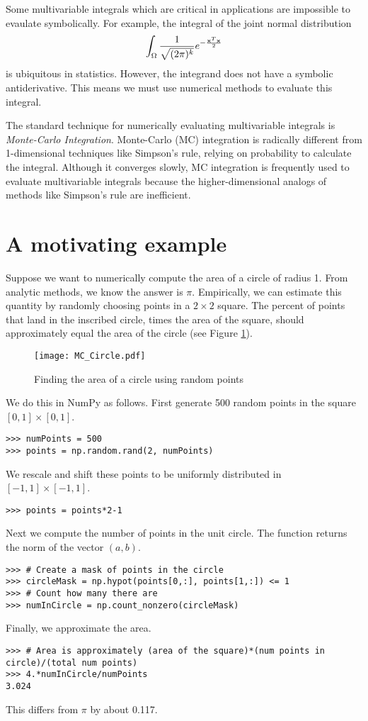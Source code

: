 
Some multivariable integrals which are critical in applications are impossible to evaulate symbolically.
For example, the integral of the joint normal distribution
\[
\int_{\Omega} \frac{1}{\sqrt{(2 \pi)^k}} e^{- \frac{\bold{x}^T\bold{x}}{2}}
\]
is ubiquitous in statistics.
However, the integrand does not have a symbolic antiderivative.
This means we must use numerical methods to evaluate this integral.

The standard technique for numerically evaluating multivariable integrals is \emph{Monte-Carlo Integration}.
Monte-Carlo (MC) integration is radically different from 1-dimensional techniques like Simpson's rule, relying on probability to calculate the integral.
Although it converges slowly, MC integration is frequently used to evaluate multivariable integrals because the higher-dimensional analogs of methods like Simpson's rule are inefficient. 

\section*{A motivating example}
Suppose we want to numerically compute the area of a circle of radius 1.
From analytic methods, we know the answer is $\pi$.
Empirically, we can estimate this quantity by randomly choosing points in a $2 \times 2$ square.
The percent of points that land in the inscribed circle, times the area of the square, should approximately equal the area of the circle (see Figure \ref{fig:MCCircle}).

\begin{figure}
\texttt{[image: MC\_Circle.pdf]}
\caption{Finding the area of a circle using random points}
\label{fig:MCCircle}
\end{figure}

We do this in NumPy as follows. First generate 500 random points in the square $[0,1] \times [0,1]$.
\begin{lstlisting}
>>> numPoints = 500
>>> points = np.random.rand(2, numPoints)
\end{lstlisting}
We rescale and shift these points to be uniformly distributed in $[-1,1]\times[-1,1]$.
\begin{lstlisting}
>>> points = points*2-1
\end{lstlisting}
Next we compute the number of points in the unit circle.
The function  returns the norm of the vector $(a, b)$.
\begin{lstlisting}
>>> # Create a mask of points in the circle
>>> circleMask = np.hypot(points[0,:], points[1,:]) <= 1
>>> # Count how many there are
>>> numInCircle = np.count_nonzero(circleMask)
\end{lstlisting}
Finally, we approximate the area.
\begin{lstlisting}
>>> # Area is approximately (area of the square)*(num points in circle)/(total num points)
>>> 4.*numInCircle/numPoints
3.024
\end{lstlisting}
This differs from $\pi$ by about 0.117.






